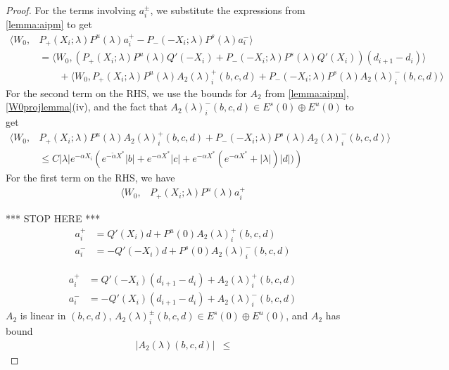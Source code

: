 \documentclass[thesis.tex]{subfiles}
\begin{document}
\begin{lemma}
\begin{proof}
For the terms involving $a_i^\pm$, we substitute the expressions from \cref{lemma:aipm} to get
\begin{align*}
\langle W_0, &P_+(X_i; \lambda)P^u(\lambda) a_i^+ - P_-(-X_i; \lambda)P^s(\lambda) a_i^- \rangle \\
&= \langle W_0, (P_+(X_i; \lambda)P^u(\lambda) Q'(-X_i) + P_-(-X_i; \lambda)P^s(\lambda) Q'(X_i)) (d_{i+1} - d_i ) \rangle \\
&\qquad+\langle W_0, P_+(X_i; \lambda)P^u(\lambda) A_2(\lambda)_i^+(b, c, d) + P_-(-X_i; \lambda)P^s(\lambda) A_2(\lambda)_i^-(b, c, d) \rangle 
\end{align*}
For the second term on the RHS, we use the bounds for $A_2$ from \cref{lemma:aipm}, \cref{W0projlemma}(iv), and the fact that $A_2(\lambda)_i^-(b, c, d) \in E^s(0) \oplus E^u(0)$ to get
\begin{align*}
\langle W_0, &P_+(X_i; \lambda)P^u(\lambda) A_2(\lambda)_i^+(b, c, d) + P_-(-X_i; \lambda)P^s(\lambda) A_2(\lambda)_i^-(b, c, d) \rangle \\
&\leq C |\lambda|e^{-\alpha X_i } \left(e^{-\tilde{\alpha} X^*}|b| + e^{-\alpha X^*}|c| + e^{-\alpha X^*}(e^{-\alpha X^*} + |\lambda|)|d| ) \right) \label{A2bound}
\end{align*}
For the first term on the RHS, we have
\begin{align*}
\langle W_0, &P_+(X_i; \lambda)P^u(\lambda) a_i^+
\end{align*}

*** STOP HERE ***
\begin{align*}
a_i^+ &= Q'(X_i) d + P^u(0) A_2(\lambda)_i^+(b, c, d)\\
a_i^- &= -Q'(-X_i) d + P^s(0) A_2(\lambda)_i^-(b, c, d)
\end{align*}


\begin{equation}\label{aipmexp1}
\begin{aligned}
a_i^+ &= Q'(-X_i) (d_{i+1} - d_i ) + A_2(\lambda)_i^+(b, c, d)\\
a_i^- &= -Q'(X_i) (d_{i+1} - d_i ) + A_2(\lambda)_i^-(b, c, d)
\end{aligned}
\end{equation}
$A_2$ is linear in $(b, c, d)$, $A_2(\lambda)_i^\pm(b, c, d) \in E^s(0) \oplus E^u(0)$, and $A_2$ has bound
\begin{align}
|A_2(\lambda)(b, c, d)|
&\leq 
\end{align}






\end{proof}
\end{lemma}
\end{document}
